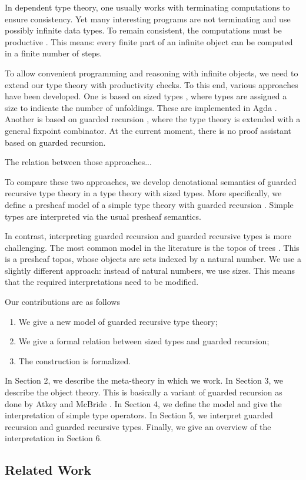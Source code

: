 In dependent type theory, one usually works with terminating computations to ensure consistency.
Yet many interesting programs are not terminating and use possibly infinite data types.
To remain consistent, the computations must be productive \cite{Coquand93}.
This means: every finite part of an infinite object can be computed in a finite number of steps.

To allow convenient programming and reasoning with infinite objects, we need to extend our type theory with productivity checks.
To this end, various approaches have been developed.
One is based on sized types \cite{A-sized,AVW-normalization}, where types are assigned a size to indicate the number of unfoldings.
These are implemented in Agda \cite{norell2008}.
Another is based on guarded recursion \cite{atkey2013productive,BahrGM17}, where the type theory is extended with a general fixpoint combinator.
At the current moment, there is no proof assistant based on guarded recursion.

The relation between those approaches...

To compare these two approaches, we develop denotational semantics of guarded recursive type theory in a type theory with sized types.
More specifically, we define a presheaf model of a simple type theory with guarded recursion \cite{BMSS-synthetic}.
Simple types are interpreted via the usual presheaf semantics.

In contrast, interpreting guarded recursion and guarded recursive types is more challenging.
The most common model in the literature is the topos of trees \cite{BMSS-synthetic}.
This is a presheaf topos, whose objects are sets indexed by a natural number.
We use a slightly different approach: instead of natural numbers, we use sizes.
This means that the required interpretations need to be modified.

Our contributions are as follows
\begin{enumerate}
	\item We give a new model of guarded recursive type theory;
	\item We give a formal relation between sized types and guarded recursion;
	\item The construction is formalized.
\end{enumerate}

In Section 2, we describe the meta-theory in which we work.
In Section 3, we describe the object theory.
This is basically a variant of guarded recursion as done by Atkey and McBride \cite{atkey2013productive}.
In Section 4, we define the model and give the interpretation of simple type operators.
In Section 5, we interpret guarded recursion and guarded recursive types.
Finally, we give an overview of the interpretation in Section 6.

\subsection*{Related Work}